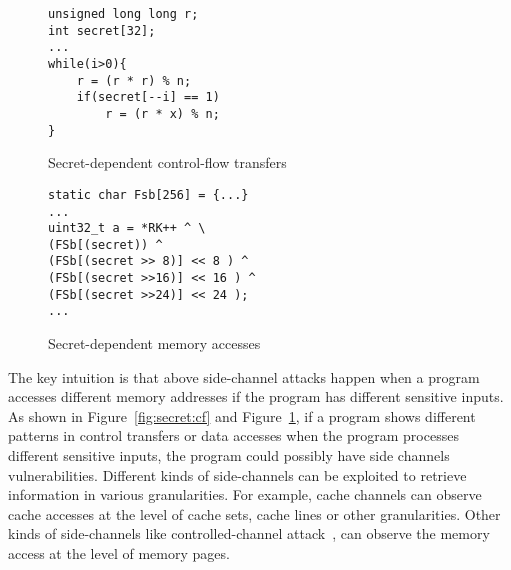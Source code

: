 \begin{figure}[]

    \noindent\begin{minipage}{0.45\linewidth}
        \noindent
        \begin{lstlisting}[numbers = none]
unsigned long long r;
int secret[32];
...
while(i>0){
    r = (r * r) % n;
    if(secret[--i] == 1)
        r = (r * x) % n;   
}
        \end{lstlisting}
\vspace*{-9pt}
        \caption{Secret-dependent control-flow transfers}
        \label{fig:secret:cf}
    \end{minipage}
    \hfill
    \begin{minipage}{0.45\linewidth}
        \begin{lstlisting}[numbers = none]
static char Fsb[256] = {...}
... 
uint32_t a = *RK++ ^ \ 
(FSb[(secret)) ^
(FSb[(secret >> 8)] << 8 ) ^
(FSb[(secret >>16)] << 16 ) ^
(FSb[(secret >>24)] << 24 );
...
        \end{lstlisting}
\vspace*{-9pt}
        \caption{Secret-dependent memory accesses}
        \label{fig:secret:da}
    \end{minipage}
\vspace*{-12pt}
\end{figure}

The key intuition is that above side-channel attacks happen when a
program accesses different memory addresses if the program has different
sensitive inputs. As shown in Figure~\ref{fig:secret:cf} and Figure~\ref{fig:secret:da}, 
if a program shows different patterns in
control transfers or data accesses when the program processes different
sensitive inputs, the program could possibly have side channels vulnerabilities.
Different kinds of side-channels can be exploited to retrieve information in
various granularities. For example, cache channels can observe cache
accesses at the level of cache sets, cache lines or other granularities. 
Other kinds of side-channels like controlled-channel attack~\cite{7163052},
can observe the memory access at the level of memory pages.

%

